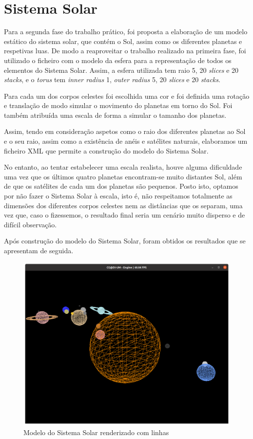 \documentclass[a4paper, 11pt]{article}
\begin{document}
\pagebreak

\section{Sistema Solar}

Para a segunda fase do trabalho prático, foi proposta a elaboração de um modelo
estático do sistema solar, que contém o Sol, assim como os diferentes planetas e
respetivas luas. De modo a reaproveitar o trabalho realizado na primeira fase, foi
utilizado o ficheiro com o modelo da esfera para a representação de todos os elementos
do Sistema Solar. Assim, a esfera utilizada tem raio 5, 20 \textit{slices} e 20 \textit{stacks},
e o \textit{torus} tem \textit{inner radius} 1, \textit{outer radius} 5, 20 \textit{slices}
e 20 \textit{stacks}.

Para cada um dos corpos celestes foi escolhida uma cor e foi definida uma rotação
e translação de modo simular o movimento do planetas em torno do Sol. Foi também
atribuída uma escala de forma a simular o tamanho dos planetas.

Assim, tendo em consideração aspetos como o raio dos diferentes planetas ao Sol
e o seu raio, assim como a existência de anéis e satélites naturais, elaboramos um
ficheiro XML que permite a construção do modelo do Sistema Solar.

No entanto, ao tentar estabelecer uma escala realista, houve alguma dificuldade
uma vez que os últimos quatro planetas encontram-se muito distantes Sol, além de
que os satélites de cada um dos planetas são pequenos. Posto isto,
optamos por não fazer o Sistema Solar à escala, isto é, não respeitamos totalmente
as dimensões dos diferentes corpos celestes nem as distâncias que os separam, uma
vez que, caso o fizessemos, o resultado final seria um cenário muito disperso e de
difícil observação.

Após construção do modelo do Sistema Solar, foram obtidos os resultados que se
apresentam de seguida.

\begin{figure}[H]
    \centering
    \includegraphics[width=.8\textwidth]{img/solarl.png}
    \caption{Modelo do Sistema Solar renderizado com linhas}
\end{figure}
\end{document}

